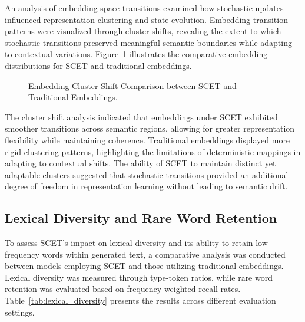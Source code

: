 \documentclass{article}
\begin{document}
An analysis of embedding space transitions examined how stochastic updates influenced representation clustering and state evolution. Embedding transition patterns were visualized through cluster shifts, revealing the extent to which stochastic transitions preserved meaningful semantic boundaries while adapting to contextual variations. Figure~\ref{fig:embedding_transitions} illustrates the comparative embedding distributions for SCET and traditional embeddings.

\begin{figure}[h]
	\centering
	\caption{Embedding Cluster Shift Comparison between SCET and Traditional Embeddings.}
	\label{fig:embedding_transitions}
\end{figure}

The cluster shift analysis indicated that embeddings under SCET exhibited smoother transitions across semantic regions, allowing for greater representation flexibility while maintaining coherence. Traditional embeddings displayed more rigid clustering patterns, highlighting the limitations of deterministic mappings in adapting to contextual shifts. The ability of SCET to maintain distinct yet adaptable clusters suggested that stochastic transitions provided an additional degree of freedom in representation learning without leading to semantic drift.

\subsection{Lexical Diversity and Rare Word Retention}

To assess SCET’s impact on lexical diversity and its ability to retain low-frequency words within generated text, a comparative analysis was conducted between models employing SCET and those utilizing traditional embeddings. Lexical diversity was measured through type-token ratios, while rare word retention was evaluated based on frequency-weighted recall rates. Table~\ref{tab:lexical_diversity} presents the results across different evaluation settings.
\end{document}

